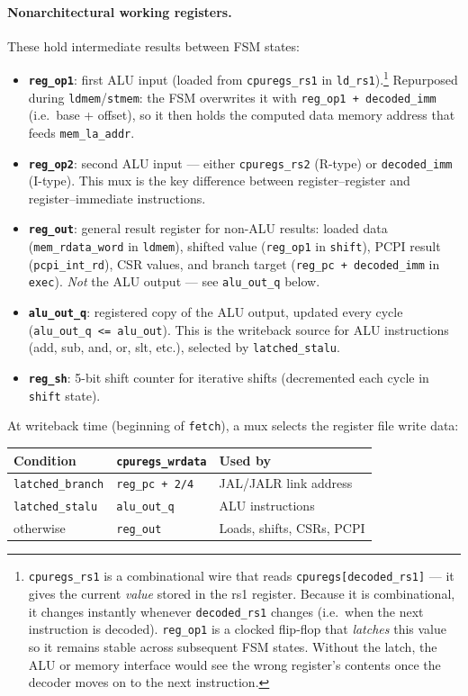 \documentclass[9pt, a4paper]{extarticle}
\begin{document}
\paragraph{Nonarchitectural working registers.} These hold intermediate results between FSM states:
\begin{itemize}
    \item \textbf{\texttt{reg\_op1}}: first ALU input (loaded from \texttt{cpuregs\_rs1} in \texttt{ld\_rs1}).\footnote{\texttt{cpuregs\_rs1} is a combinational wire that reads \texttt{cpuregs[decoded\_rs1]} --- it gives the current \emph{value} stored in the rs1 register. Because it is combinational, it changes instantly whenever \texttt{decoded\_rs1} changes (i.e.\ when the next instruction is decoded). \texttt{reg\_op1} is a clocked flip-flop that \emph{latches} this value so it remains stable across subsequent FSM states. Without the latch, the ALU or memory interface would see the wrong register's contents once the decoder moves on to the next instruction.} Repurposed during \texttt{ldmem}/\texttt{stmem}: the FSM overwrites it with \texttt{reg\_op1 + decoded\_imm} (i.e.\ base + offset), so it then holds the computed data memory address that feeds \texttt{mem\_la\_addr}.
    \item \textbf{\texttt{reg\_op2}}: second ALU input --- either \texttt{cpuregs\_rs2} (R-type) or \texttt{decoded\_imm} (I-type). This mux is the key difference between register--register and register--immediate instructions.
    \item \textbf{\texttt{reg\_out}}: general result register for non-ALU results: loaded data (\texttt{mem\_rdata\_word} in \texttt{ldmem}), shifted value (\texttt{reg\_op1} in \texttt{shift}), PCPI result (\texttt{pcpi\_int\_rd}), CSR values, and branch target (\texttt{reg\_pc + decoded\_imm} in \texttt{exec}). \emph{Not} the ALU output --- see \texttt{alu\_out\_q} below.
    \item \textbf{\texttt{alu\_out\_q}}: registered copy of the ALU output, updated every cycle (\texttt{alu\_out\_q <= alu\_out}). This is the writeback source for ALU instructions (add, sub, and, or, slt, etc.), selected by \texttt{latched\_stalu}.
    \item \textbf{\texttt{reg\_sh}}: 5-bit shift counter for iterative shifts (decremented each cycle in \texttt{shift} state).
\end{itemize}

At writeback time (beginning of \texttt{fetch}), a mux selects the register file write data:
\begin{center}\small
\begin{tabular}{@{}l l l@{}}
    \toprule
    Condition & \texttt{cpuregs\_wrdata} & Used by \\
    \midrule
    \texttt{latched\_branch} & \texttt{reg\_pc + 2/4} & JAL/JALR link address \\
    \texttt{latched\_stalu} & \texttt{alu\_out\_q} & ALU instructions \\
    otherwise & \texttt{reg\_out} & Loads, shifts, CSRs, PCPI \\
    \bottomrule
\end{tabular}
\end{center}
\end{document}
